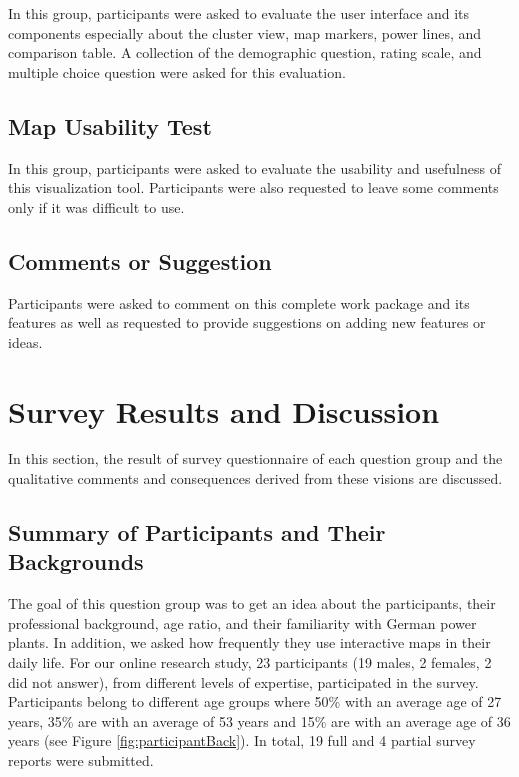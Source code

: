 In this group, participants were asked to evaluate the user interface and its components especially about the cluster view, map markers, power lines, and comparison table. A collection of the demographic question, rating scale, and multiple choice question were asked for this evaluation. 

\subsection*{Map Usability Test}
\label{sssec:MUtest}

In this group, participants were asked to evaluate the usability and usefulness of this visualization tool. Participants were also requested to leave some comments only if it was difficult to use. 

\subsection*{Comments or Suggestion}
\label{sssec:cORS}

Participants were asked to comment on this complete work package and its features as well as requested to provide suggestions on adding new features or ideas.  

\section{Survey Results and Discussion}

In this section, the result of survey questionnaire of each question group and the qualitative comments and consequences derived from these visions are discussed. 

\subsection{Summary of Participants and Their Backgrounds}

The goal of this question group was to get an idea about the participants, their professional background, age ratio, and their familiarity with German power plants. In addition, we asked how frequently they use interactive maps in their daily life. For our online research study, 23 participants (19 males, 2 females, 2 did not answer), from different levels of expertise, participated in the survey. Participants belong to different age groups where 50\% with an average age of 27 years, 35\% are with an average of 53 years and 15\% are with an average age of 36 years (see Figure \ref{fig:participantBack}). In total, 19 full and 4 partial survey reports were submitted. 

